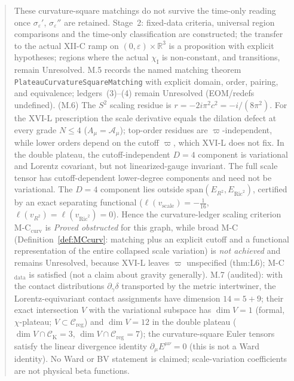 \documentclass{article}
\theoremstyle{remark}
\newcommand{\sigeps}{\sigma_\varepsilon}
\newcommand{\chiI}{\chi_{\mathrm I}}
\newcommand{\Creg}{\mathcal C_{\mathrm{reg}}}
\begin{document}
\begin{abstract}
These curvature-square matchings do not survive the time-only reading once $\sigeps'$, $\sigeps''$ are retained.
Stage~2: fixed-data criteria, universal region comparisons and the time-only classification are constructed; the transfer to the actual XII-C ramp on $(0,\varepsilon)\times\mathbb R^3$ is a proposition with explicit hypotheses; regions where the actual $\chiI$ is non-constant, and transitions, remain Unresolved.
M.5 records the named matching theorem \texttt{PlateauCurvatureSquareMatching} with explicit domain, order, pairing, and equivalence; ledgers~(3)--(4) remain Unresolved (EOM/redefs undefined).
(M.6) The $S^2$ scaling residue is $r=-2i\pi^2c^2=-i/(8\pi^2)$.
For the XVI-L prescription the scale derivative equals the dilation defect at every grade $N\le4$ ($A_\mu=\mathcal A_\mu$); top-order residues are $\varpi$-independent, while lower orders depend on the cutoff $\varpi$, which XVI-L does not fix.
In the double plateau, the cutoff-independent $D=4$ component is variational and Lorentz covariant, but not linearized-gauge invariant. The full scale tensor has cutoff-dependent lower-degree components and need not be variational. The $D=4$ component lies outside $\mathrm{span}(E_{R^2},E_{\mathrm{Ric}^2})$, certified by an exact separating functional ($\ell(v_{\mathrm{scale}})=-\tfrac1{16}$, $\ell(v_{R^2})=\ell(v_{\mathrm{Ric}^2})=0$). Hence the curvature-ledger scaling criterion M-C$_{\mathrm{curv}}$ is \emph{Proved obstructed} for this graph, while broad M-C (Definition~\ref{def:MCcurv}: matching plus an explicit cutoff and a functional representation of the entire collapsed scale variation) is \emph{not achieved} and remains Unresolved, because XVI-L leaves $\varpi$ unspecified (thm:L6); M-C$_{\mathrm{data}}$ is satisfied (not a claim about gravity generally).
M.7 (audited): with the contact distributions $\partial_\gamma\delta$ transported by the metric intertwiner, the Lorentz-equivariant contact assignments have dimension $14=5+9$; their exact intersection $V$ with the variational subspace has $\dim V=1$ (formal, $\chi$-plateau; $V\subset\Creg$) and $\dim V=12$ in the double plateau ($\dim V\cap\mathcal C_{\mathrm K}=3$, $\dim V\cap\Creg=7$); the curvature-square Euler tensors satisfy the linear divergence identity $\partial_\mu E^{\mu\nu}=0$ (this is not a Ward identity).
No Ward or BV statement is claimed; scale-variation coefficients are not physical beta functions.
\end{abstract}
\end{document}
